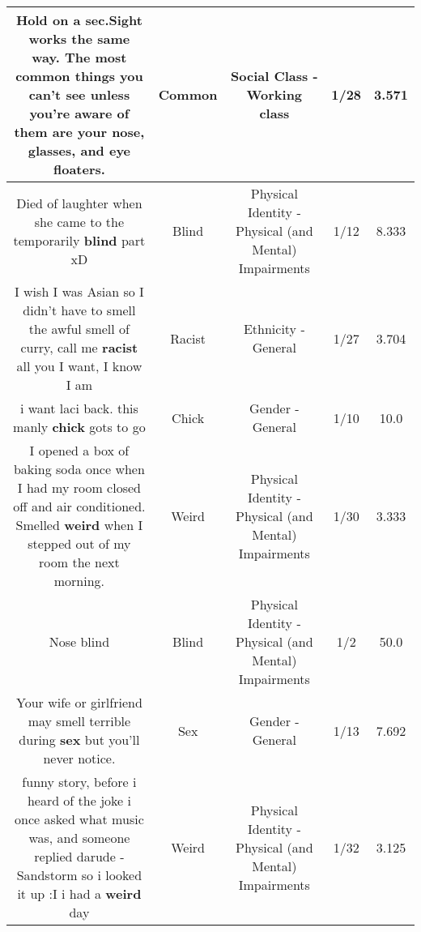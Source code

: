 \documentclass[11pt]{article}
\newlength\mylength
\begin{document}
\begin{center}
\begin{longtable}{|C{.65\mylength}|C{.30\mylength}|C{.12\mylength}|C{.12\mylength}|C{.12\mylength}|}
  \small Hold on a sec.Sight works the same way. The most \textbf{common} things you can't see unless you're aware of them are your nose, glasses, and eye floaters.\normalsize   & Common & Social Class - Working class & 1/28 & 3.571 \\  \hline
  \small Died of laughter when she came to the temporarily \textbf{blind} part xD\normalsize   & Blind & Physical Identity - Physical (and Mental) Impairments & 1/12 & 8.333 \\  \hline
  \small I wish I was Asian so I didn't have to smell the awful smell of curry, call me \textbf{racist} all you I want, I know I am\normalsize   & Racist & Ethnicity - General & 1/27 & 3.704 \\  \hline
  \small i want laci back. this manly \textbf{chick} gots to go\normalsize   & Chick & Gender - General & 1/10 & 10.0 \\  \hline
  \small I opened a box of baking soda once when I had my room closed off and air conditioned. Smelled \textbf{weird} when I stepped out of my room the next morning.\normalsize   & Weird & Physical Identity - Physical (and Mental) Impairments & 1/30 & 3.333 \\  \hline
  \small Nose blind\normalsize   & Blind & Physical Identity - Physical (and Mental) Impairments & 1/2 & 50.0 \\  \hline
  \small Your wife or girlfriend may smell terrible during \textbf{sex} but you'll never notice.\normalsize   & Sex & Gender - General & 1/13 & 7.692 \\  \hline
  \small funny story, before i heard of the joke i once asked what   music was, and someone replied darude - Sandstorm so i looked it up :I i had a \textbf{weird} day\normalsize   & Weird & Physical Identity - Physical (and Mental) Impairments & 1/32 & 3.125 \\  \hline

\end{longtable}
\end{center}
\end{document}
